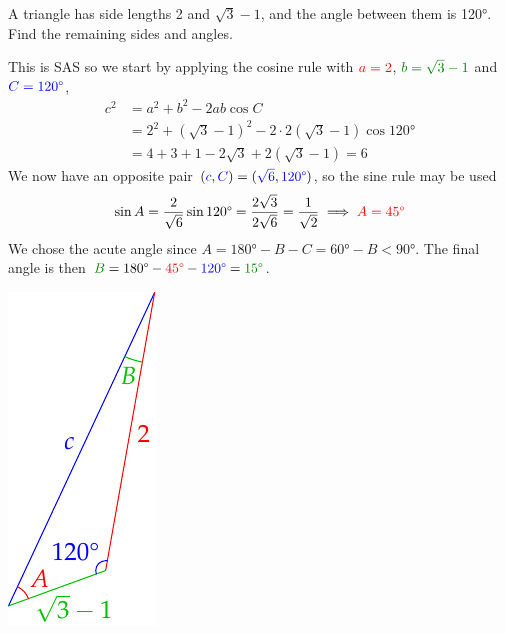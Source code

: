 \begin{examples}{}{}
	\exstart A triangle has side lengths 2 and $\sqrt 3-1$, and the angle between them is \ang{120}. Find the remaining sides and angles.\par
	\begin{enumerate}\setcounter{enumi}{1}
		\begin{minipage}[t]{0.79\linewidth}\vspace{-10pt}
			\item[]This is SAS so we start by applying the cosine rule with $\textcolor{red}{a=2}$, $\textcolor{Green}{b=\sqrt 3-1}$ and $\textcolor{blue}{C=\ang{120}}$,
		  \begin{align*}
		    c^2&=a^2+b^2-2ab\cos C\\
		    &=2^2+(\sqrt 3-1)^2-2\cdot 2(\sqrt 3-1)\cos\ang{120} \\
		    &=4+3+1-2\sqrt 3+2(\sqrt 3-1) =6
		  \end{align*}
		  We now have an opposite pair $(\textcolor{blue}{c},\textcolor{blue}{C})=(\textcolor{blue}{\sqrt 6},\textcolor{blue}{\ang{120}})$, so the sine rule may be used
		  \[
		  	\sin A=\frac 2{\sqrt 6}\sin\ang{120}=\frac{2\sqrt 3}{2\sqrt 6}=\frac 1{\sqrt 2}\implies \textcolor{red}{A=\ang{45}}
		  \]
		  We chose the acute angle since $A=\ang{180}-B-C=\ang{60}-B<\ang{90}$.\smallbreak
		  The final angle is then $\textcolor{Green}{B}=\ang{180}-\textcolor{red}{\ang{45}}-\textcolor{blue}{\ang{120}}=\textcolor{Green}{\ang{15}}$.
		\end{minipage}
		\hfill
		\begin{minipage}[t]{0.2\linewidth}\vspace{-8pt}
			\flushright\includegraphics{exsas}
		\end{minipage}


\end{enumerate}
\end{examples}
